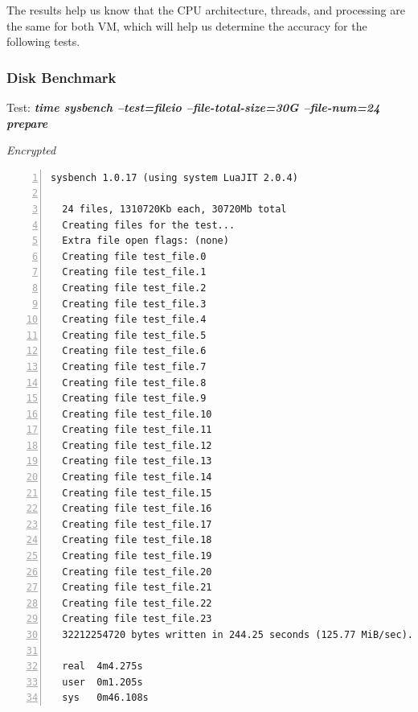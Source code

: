 The results help us know that the CPU architecture, threads, and processing are the same for both VM, which will help us determine the accuracy for the following tests.
\newpage
\subsubsection{Disk Benchmark}
\begin{center}
  Test: \textbf{\textit{time sysbench --test=fileio --file-total-size=30G --file-num=24 prepare}}  
\end{center}
\vspace*{-\baselineskip}
\noindent\begin{minipage}[t]{0.45\linewidth}
  \centering
  \textit{Encrypted}
  \begin{lstlisting}[basicstyle=\tiny,frame=single, numbers=left, label=cpu_test1]
  sysbench 1.0.17 (using system LuaJIT 2.0.4)

  24 files, 1310720Kb each, 30720Mb total
  Creating files for the test...
  Extra file open flags: (none)
  Creating file test_file.0
  Creating file test_file.1
  Creating file test_file.2
  Creating file test_file.3
  Creating file test_file.4
  Creating file test_file.5
  Creating file test_file.6
  Creating file test_file.7
  Creating file test_file.8
  Creating file test_file.9
  Creating file test_file.10
  Creating file test_file.11
  Creating file test_file.12
  Creating file test_file.13
  Creating file test_file.14
  Creating file test_file.15
  Creating file test_file.16
  Creating file test_file.17
  Creating file test_file.18
  Creating file test_file.19
  Creating file test_file.20
  Creating file test_file.21
  Creating file test_file.22
  Creating file test_file.23
  32212254720 bytes written in 244.25 seconds (125.77 MiB/sec).
  
  real	4m4.275s
  user	0m1.205s
  sys	0m46.108s
  \end{lstlisting}
\end{minipage}
\hspace{0.5cm}

